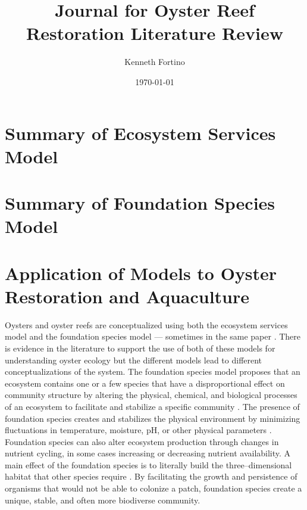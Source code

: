 \documentclass{article}
\begin{document}
\title{Journal for Oyster Reef Restoration Literature Review}
\author{Kenneth Fortino}
\date{\today}

\maketitle

\section{Summary of Ecosystem Services Model}

\section{Summary of Foundation Species Model}

\section{Application of Models to Oyster Restoration and Aquaculture}

Oysters and oyster reefs are conceptualized using both the ecosystem services model and the foundation species model --- sometimes in the same paper \cite{mercaldo-allen_oyster_2023}. There is evidence in the literature to support the use of both of these models for understanding oyster ecology but the different models lead to different conceptualizations of the system. The foundation species model proposes that an ecosystem contains one or a few species that have a disproportional effect on community structure by altering the physical, chemical, and biological processes of an ecosystem to facilitate and stabilize a specific community \cite{fields_foundation_2022}. The presence of foundation species creates and stabilizes the physical environment by minimizing fluctuations in temperature, moisture, pH, or other physical parameters \cite{ellison_loss_2005}. Foundation species can also alter ecosystem production through changes in nutrient cycling, in some cases increasing \cite{fields_foundation_2022} or decreasing \cite{ellison_loss_2005} nutrient availability. A main effect of the foundation species is to literally build the three--dimensional habitat that other species require \cite{angelini_interactions_2011, mercaldo-allen_oyster_2023}. By facilitating the growth and persistence of organisms that would not be able to colonize a patch, foundation species create a unique, stable, and often more biodiverse community. 
\end{document}
